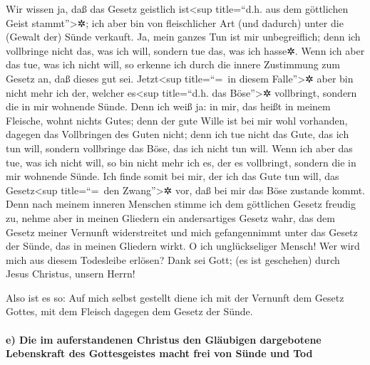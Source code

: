  Wir wissen ja, daß das Gesetz geistlich ist\textless sup
title=``d.h. aus dem göttlichen Geist stammt''\textgreater✲; ich aber
bin von fleischlicher Art (und dadurch) unter die (Gewalt der) Sünde
verkauft.  Ja, mein ganzes Tun ist mir unbegreiflich;
denn ich vollbringe nicht das, was ich will, sondern tue das, was ich
hasse✲.  Wenn ich aber das tue, was ich nicht will, so
erkenne ich durch die innere Zustimmung zum Gesetz an, daß dieses gut
sei.  Jetzt\textless sup title=``=~in diesem
Falle''\textgreater✲ aber bin nicht mehr ich der, welcher
es\textless sup title=``d.h. das Böse''\textgreater✲ vollbringt, sondern
die in mir wohnende Sünde.  Denn ich weiß ja: in mir, das
heißt in meinem Fleische, wohnt nichts Gutes; denn der gute Wille ist
bei mir wohl vorhanden, dagegen das Vollbringen des Guten nicht;
 denn ich tue nicht das Gute, das ich tun will, sondern
vollbringe das Böse, das ich nicht tun will.  Wenn ich
aber das tue, was ich nicht will, so bin nicht mehr ich es, der es
vollbringt, sondern die in mir wohnende Sünde.  Ich finde
somit bei mir, der ich das Gute tun will, das Gesetz\textless sup
title=``=~den Zwang''\textgreater✲ vor, daß bei mir das Böse zustande
kommt.  Denn nach meinem inneren Menschen stimme ich dem
göttlichen Gesetz freudig zu,  nehme aber in meinen
Gliedern ein andersartiges Gesetz wahr, das dem Gesetz meiner Vernunft
widerstreitet und mich gefangennimmt unter das Gesetz der Sünde, das in
meinen Gliedern wirkt.  O ich unglückseliger Mensch! Wer
wird mich aus diesem Todesleibe erlösen?  Dank sei Gott;
(es ist geschehen) durch Jesus Christus, unsern Herrn!

Also ist es so: Auf mich selbst gestellt diene ich mit der Vernunft dem
Gesetz Gottes, mit dem Fleisch dagegen dem Gesetz der Sünde.

\hypertarget{e-die-im-auferstandenen-christus-den-gluxe4ubigen-dargebotene-lebenskraft-des-gottesgeistes-macht-frei-von-suxfcnde-und-tod}{%
\paragraph{e) Die im auferstandenen Christus den Gläubigen dargebotene
Lebenskraft des Gottesgeistes macht frei von Sünde und
Tod}\label{e-die-im-auferstandenen-christus-den-gluxe4ubigen-dargebotene-lebenskraft-des-gottesgeistes-macht-frei-von-suxfcnde-und-tod}}


